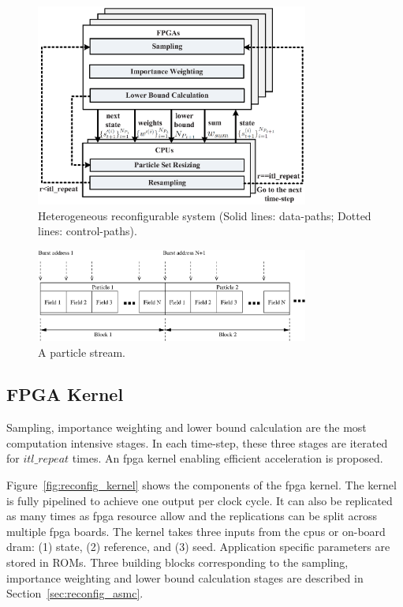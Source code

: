 \begin{figure}[t!]
\centering
\includegraphics[width=0.8\textwidth]{4_adaptation/figures/fig_arch}
\caption[Heterogeneous reconfigurable system]{Heterogeneous reconfigurable system (Solid lines: data-paths; Dotted lines: control-paths).}
\label{fig:reconfig_arch}
\end{figure}

\begin{figure}[t!]
\centering
\includegraphics[width=0.8\textwidth]{4_adaptation/figures/fig_particles}
\caption{A particle stream.}
\label{fig:particles_stream}
\end{figure}

\subsection{FPGA Kernel}
Sampling, importance weighting and lower bound calculation are the most computation intensive stages.
In each time-step, these three stages are iterated for $itl\_repeat$ times.
An \gls{fpga} kernel enabling efficient acceleration is proposed.

Figure~\ref{fig:reconfig_kernel} shows the components of the \gls{fpga} kernel.
The kernel is fully pipelined to achieve one output per clock cycle.
It can also be replicated as many times as \gls{fpga} resource allow and the replications can be split across multiple \gls{fpga} boards.
The kernel takes three inputs from the \glspl{cpu} or on-board \gls{dram}: (1) state, (2) reference, and (3) seed.
Application specific parameters are stored in ROMs.
Three building blocks corresponding to the sampling, importance weighting and lower bound calculation stages are described in Section~\ref{sec:reconfig_asmc}.

